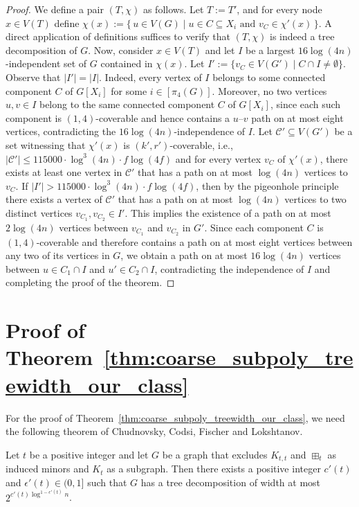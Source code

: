 \begin{proof}
    We define a pair $(T,\chi)$ as follows. Let $T := T'$, and for every node $x \in V(T)$ define $\chi(x) := \{\, u \in V(G) \mid \text{$u \in C \subseteq X_i$ and $v_{C} \in \chi'(x)$} \,\}$. A direct application of definitions suffices to verify that $(T,\chi)$ is indeed a tree decomposition of $G$. 
    Now, consider $x\in V(T)$ and let $I$ be a largest $16\log (4n)$-independent set of $G$ contained in $\chi(x)$. Let $I' := \{v_C\in V(G') \mid C\cap I \neq \emptyset\}$. Observe that $|I'| = |I|$. Indeed, every vertex of $I$ belongs to some connected component $C$ of $G[X_i]$ for some $i\in[\pi_4(G)]$. Moreover, no two vertices $u,v \in I$ belong to the same connected component $C$ of $G[X_i]$, since each such component is $(1,4)$-coverable and hence contains a $u$--$v$ path on at most eight vertices, contradicting the $16\log (4n)$-independence of $I$.
    Let $\mathcal{C}' \subseteq V(G')$ be a set witnessing that $\chi'(x)$ is $(k',r')$-coverable, i.e., $|\mathcal{C}'| \leq 115000 \cdot \log^3 (4n) \cdot f \log (4f)$ and for every vertex $v_C$ of $\chi'(x)$, there exists at least one vertex in $\mathcal{C}'$ that has a path on at most $\log (4n)$ vertices to $v_C$. If $|I'| > 115000 \cdot \log^3 (4n) \cdot f \log (4f)$, then by the pigeonhole principle there exists a vertex of $\mathcal{C}'$ that has a path on at most $\log (4n)$ vertices to two distinct vertices $v_{C_1}, v_{C_2} \in I'$.
    This implies the existence of a path on at most $2\log (4n)$ vertices between $v_{C_1}$ and $v_{C_2}$ in $G'$. Since each component $C$ is $(1,4)$-coverable and therefore contains a path on at most eight vertices between any two of its vertices in $G$, we obtain a path on at most $16\log (4n)$ vertices between $u\in C_1\cap I$ and $u'\in C_2\cap I$, contradicting the independence of $I$ and completing the proof of the theorem.
\end{proof}

\section{Proof of Theorem~\ref{thm:coarse_subpoly_treewidth_our_class}}  



For the proof of Theorem~\ref{thm:coarse_subpoly_treewidth_our_class}, we need the following theorem of Chudnovsky, Codsi, Fischer and Lokshtanov.

\begin{proposition}\label{prop:subpoly_treewidth}
    Let $t$ be a positive integer and let $G$ be a graph that excludes $K_{t,t}$ and $\boxplus_t$ as induced minors and $K_t$ as a subgraph. Then there exists a positive integer $c'(t)$ and $\epsilon'(t)\in(0,1]$ such that $G$ has a tree decomposition of width at most $2^{c'(t) \log^{1-\epsilon'(t)} n}$.
\end{proposition}

